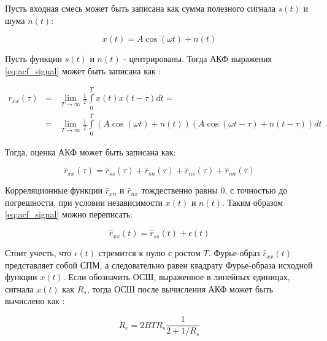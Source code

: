 Пусть входная смесь может быть записана как сумма полезного сигнала ${s(t)}$ и шума ${n(t)}$:
\begin{center}
\begin{equation}
	\label{eq:acf_signal}
	x(t) = A \cos{(\omega t)} + n(t)
\end{equation}
\end{center}

Пусть функции ${s(t)}$ и ${n(t)}$ - центрированы. Тогда АКФ выражения \ref{eq:acf_signal} может быть записана как \cite{book_max}:
\begin{center}
\begin{eqnarray}
	\label{eq:acf_rss_signal}
	r_{xx}(\tau)	& = & \lim_{T \to \infty} \frac{1}{T} \int \limits_0^T x(t)x(t-\tau)dt = \nonumber \\
			& = & \lim_{T \to \infty} \frac{1}{T} \int \limits_0^T (A \cos{(\omega t)} + n(t))(A \cos{(\omega t - \tau)} + n(t - \tau))dt
\end{eqnarray}
\end{center}

Тогда, оценка АКФ может быть записана как:
\begin{center}
\begin{equation}
	\label{eq:acf_rss_signal_full}
	\hat{r}_{xx}(\tau)=\hat{r}_{ss}(\tau)+\hat{r}_{sn}(\tau)+\hat{r}_{ns}(\tau) + \hat{r}_{nn}(\tau)
\end{equation}
\end{center}

Корреляционные функции ${\hat{r}_{xn}}$ и ${\hat{r}_{nx}}$ тождественно равны 0, с точностью до погрешности, при условии независимости
${x(t)}$ и ${n(t)}$. Таким образом \ref{eq:acf_signal} можно переписать:
\begin{center}
\begin{equation}
	\label{eq:acf_rss_signal_new}
	\hat{r}_{xx}(t) = \hat{r}_{ss}(t) + \epsilon (t)
\end{equation}
\end{center}
Стоит учесть, что ${\epsilon (t)}$ стремится к нулю с ростом ${T}$. Фурье-образ ${\hat{r}_{xx}(t)}$
представляет собой СПМ, а следовательно равен квадрату Фурье-образа исходной функции ${x(t)}$.
Если обозначить ОСШ, выраженное в линейных единицах, сигнала ${x(t)}$ как ${R_s}$, тогда ОСШ после вычисления АКФ может быть вычислено
как \cite{book_max}:
\begin{center}
\begin{equation}
	\label{eq:acf_snr_est}
	R_e=2BTR_s \frac{1}{2+1/R_s}
\end{equation}
\end{center}

